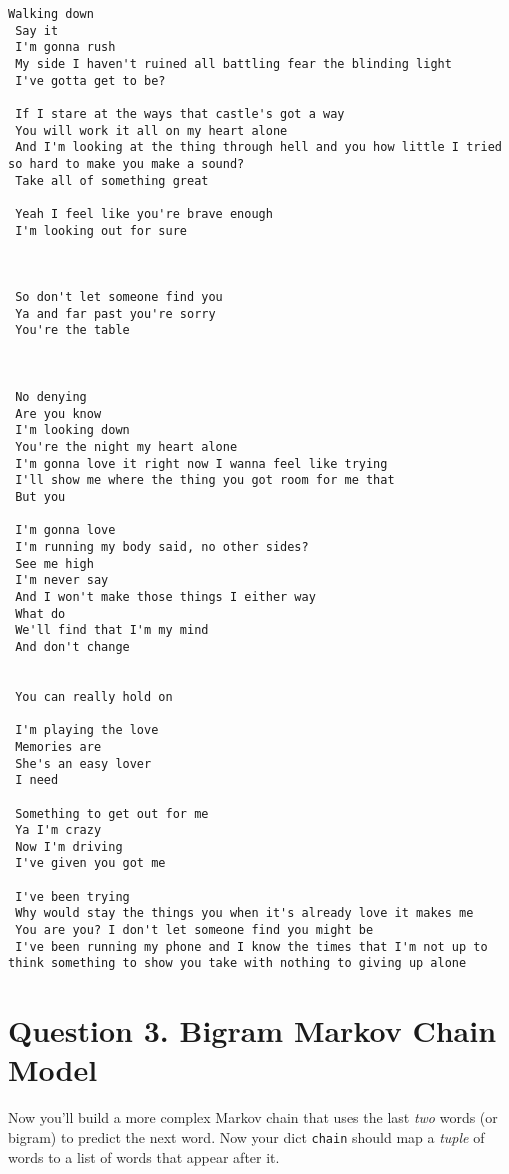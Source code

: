 \documentclass[11pt]{article}
\begin{document}
    \begin{Verbatim}[commandchars=\\\{\}]
Walking down 
 Say it 
 I'm gonna rush 
 My side I haven't ruined all battling fear the blinding light 
 I've gotta get to be? 
 
 If I stare at the ways that castle's got a way 
 You will work it all on my heart alone 
 And I'm looking at the thing through hell and you how little I tried so hard to make you make a sound? 
 Take all of something great 
 
 Yeah I feel like you're brave enough 
 I'm looking out for sure 
 
 
 
 So don't let someone find you 
 Ya and far past you're sorry 
 You're the table 
 
 
 
 No denying 
 Are you know 
 I'm looking down 
 You're the night my heart alone 
 I'm gonna love it right now I wanna feel like trying 
 I'll show me where the thing you got room for me that 
 But you 
 
 I'm gonna love 
 I'm running my body said, no other sides? 
 See me high 
 I'm never say 
 And I won't make those things I either way 
 What do 
 We'll find that I'm my mind 
 And don't change 
 
 
 You can really hold on 
 
 I'm playing the love 
 Memories are 
 She's an easy lover 
 I need 
 
 Something to get out for me 
 Ya I'm crazy 
 Now I'm driving 
 I've given you got me 
 
 I've been trying 
 Why would stay the things you when it's already love it makes me 
 You are you? I don't let someone find you might be 
 I've been running my phone and I know the times that I'm not up to think something to show you take with nothing to giving up alone

    \end{Verbatim}

    \hypertarget{question-3.-bigram-markov-chain-model}{%
\section{Question 3. Bigram Markov Chain
Model}\label{question-3.-bigram-markov-chain-model}}

Now you'll build a more complex Markov chain that uses the last
\emph{two} words (or bigram) to predict the next word. Now your dict
\texttt{chain} should map a \emph{tuple} of words to a list of words
that appear after it.
\end{document}
